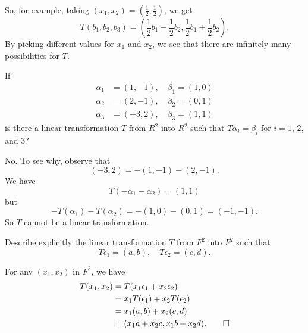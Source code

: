\begin{solution}
  So, for example, taking
  $(x_1, x_2) = \left(\frac12, \frac12\right)$, we get
  \begin{equation*}
    T(b_1, b_2, b_3) = \left(\frac12b_1 - \frac12b_2,
      \frac12b_1 + \frac12b_2\right).
  \end{equation*}
  By picking different values for $x_1$ and $x_2$, we see that there
  are infinitely many possibilities for $T$.
\end{solution}

 If
\begin{align*}
  \alpha_1 &= (1, -1), \quad \beta_1 = (1, 0) \\
  \alpha_2 &= (2, -1), \quad \beta_2 = (0, 1) \\
  \alpha_3 &= (-3, 2), \quad \beta_3 = (1, 1)
\end{align*}
is there a linear transformation $T$ from $R^2$ into $R^2$ such that
$T\alpha_i = \beta_i$ for $i = 1$, $2$, and $3$?
\begin{solution}
  No. To see why, observe that
  \begin{equation*}
    (-3, 2) = -(1, -1) - (2, -1).
  \end{equation*}
  We have
  \begin{equation*}
    T(-\alpha_1 - \alpha_2) = (1, 1)
  \end{equation*}
  but
  \begin{equation*}
    -T(\alpha_1) - T(\alpha_2) = -(1, 0) - (0, 1) = (-1, -1).
  \end{equation*}
  So $T$ cannot be a linear transformation.
\end{solution}

 Describe explicitly the linear transformation $T$ from
$F^2$ into $F^2$ such that
\begin{equation*}
  T\epsilon_1 = (a, b), \quad T\epsilon_2 = (c, d).
\end{equation*}
\begin{solution}
  For any $(x_1, x_2)$ in $F^2$, we have
  \begin{align*}
    T(x_1, x_2)
    &= T(x_1\epsilon_1 + x_2\epsilon_2) \\
    &= x_1T(\epsilon_1) + x_2T(\epsilon_2) \\
    &= x_1(a, b) + x_2(c, d) \\
    &= (x_1a + x_2c, x_1b + x_2d). \qedhere
  \end{align*}
\end{solution}
